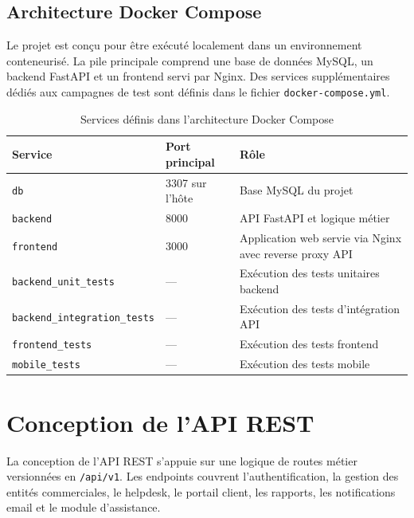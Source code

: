 
\subsection{Architecture Docker Compose}
Le projet est conçu pour être exécuté localement dans un environnement conteneurisé. La pile principale comprend une base de données MySQL, un backend FastAPI et un frontend servi par Nginx. Des services supplémentaires dédiés aux campagnes de test sont définis dans le fichier \texttt{docker-compose.yml}.

\begin{table}[H]
\centering
\caption{Services définis dans l'architecture Docker Compose}
\label{tab:docker_arch}
\begin{tabularx}{\textwidth}{|l|l|X|}
\hline
\textbf{Service} & \textbf{Port principal} & \textbf{Rôle} \\
\hline
\texttt{db} & 3307 sur l'hôte & Base MySQL du projet \\
\hline
\texttt{backend} & 8000 & API FastAPI et logique métier \\
\hline
\texttt{frontend} & 3000 & Application web servie via Nginx avec reverse proxy API \\
\hline
\texttt{backend\_unit\_tests} & --- & Exécution des tests unitaires backend \\
\hline
\texttt{backend\_integration\_tests} & --- & Exécution des tests d'intégration API \\
\hline
\texttt{frontend\_tests} & --- & Exécution des tests frontend \\
\hline
\texttt{mobile\_tests} & --- & Exécution des tests mobile \\
\hline
\end{tabularx}
\end{table}

\section{Conception de l'API REST}
La conception de l'API REST s'appuie sur une logique de routes métier versionnées en \texttt{/api/v1}. Les endpoints couvrent l'authentification, la gestion des entités commerciales, le helpdesk, le portail client, les rapports, les notifications email et le module d'assistance.

